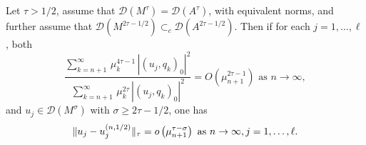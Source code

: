 \documentclass[final]{siamltex}
\numberwithin{equation}{section}
\begin{document}
\begin{theorem} \label{theo4.3}
Let $\tau>1/2$, assume that $\mathcal{D}(M^{\tau}) =\mathcal{D}(A^{\tau})$,
with equivalent norms, and further assume that
$\mathcal{D}(M^{2\tau-1/2}) \subset_{c} \mathcal{D}(A^{2\tau-1/2})$. Then if for each $j=1, \ldots, \ell$, both
\begin{equation} \label{new4.2}
\frac{\sum_{k=n+1}^{\infty}  \, \mu_{k}^{4 \tau-1} \, |(u_j, q_k)_0|^2}
{\sum_{k=n+1}^{\infty}  \, \mu_{k}^{2 \tau} \, |(u_j, q_k)_0|^2}=O\left(\mu_{n+1}^{2 \tau-1}\right) \text{ as } n\to \infty,
\end{equation}
and $u_j \in \mathcal{D}(M^{\sigma})$ with $\sigma\ge 2 \tau-1/2$, one has
\begin{equation} \notag
\|u_j-u_j^{(n,1/2)}\|_{\tau}= o\left(\mu_{n+1}^{\tau-\sigma} \right) \text{ as } n\to \infty, j=1, \dots, \ell.\end{equation}
\end{theorem}
\end{document}
